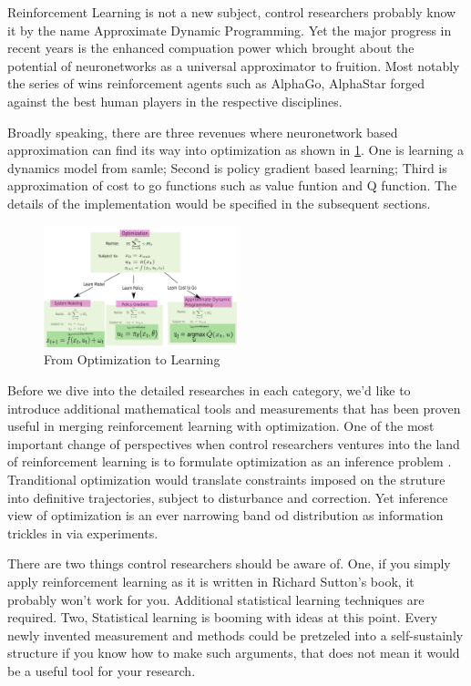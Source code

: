\documentclass[journal]{IEEEtran}
\begin{document}
Reinforcement Learning is not a new subject, control researchers probably know it by the name Approximate Dynamic Programming. Yet the major progress in recent years is the enhanced compuation power which brought about the potential of neuronetworks as a universal approximator \cite{Hornik1991ApproximationCO} to fruition. Most notably the series of wins reinforcement agents such as AlphaGo, AlphaStar forged against the best human players in the respective disciplines.

Broadly speaking, there are three revenues where neuronetwork based approximation can find its way into optimization as shown in \ref{fig:1}. One is learning a dynamics model from samle; Second is policy gradient based learning; Third is approximation of cost to go functions such as value funtion and Q function. The details of the implementation would be specified in the subsequent sections.

\begin{figure}[H]
    \centering
    \includegraphics[width=0.5\textwidth]{Control.png}
    \caption{From Optimization to Learning}
    \label{fig:1}
\end{figure}

Before we dive into the detailed researches in each category, we'd like to introduce additional mathematical tools and measurements that has been proven useful in merging reinforcement learning with optimization. One of the most important change of perspectives when control researchers ventures into the land of reinforcement learning is to formulate optimization as an inference problem \cite{Levine2018ReinforcementLA}. Tranditional optimization would translate constraints imposed on the struture into definitive trajectories, subject to disturbance and correction. Yet inference view of optimization is an ever narrowing band od distribution as information trickles in via experiments.

There are two things control researchers should be aware of. One, if you simply apply reinforcement learning as it is written in Richard Sutton's book, it probably won't work for you. Additional statistical learning techniques are required. Two, Statistical learning is booming with ideas at this point. Every newly invented measurement and methods could be pretzeled into a self-sustainly structure if you know how to make such arguments, that does not mean it would be a useful tool for your research.
\end{document}
